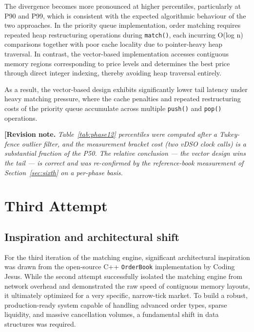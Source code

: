 \documentclass[11pt,a4paper]{article}
\newenvironment{revision}{\par\medskip\noindent\textbf{[Revision note.} \itshape}{\normalfont\par\rmfamily\medskip}
\begin{document}
The divergence becomes more pronounced at higher percentiles, particularly
at P90 and P99, which is consistent with the expected algorithmic behaviour
of the two approaches. In the priority queue implementation, order matching
requires repeated heap restructuring operations during \texttt{match()},
each incurring O(log n) comparisons together with poor cache locality due to
pointer-heavy heap traversal. In contrast, the vector-based implementation
accesses contiguous memory regions corresponding to price levels and
determines the best price through direct integer indexing, thereby avoiding
heap traversal entirely.

As a result, the vector-based design exhibits significantly lower tail
latency under heavy matching pressure, where the cache penalties and
repeated restructuring costs of the priority queue accumulate across
multiple \texttt{push()} and \texttt{pop()} operations.

\begin{revision}
Table~\ref{tab:phase12} percentiles were computed \emph{after} a
Tukey-fence outlier filter, and the measurement bracket cost
(two vDSO clock calls) is a substantial fraction of the P50. The
\emph{relative} conclusion --- the vector design wins the tail --- is
correct and was re-confirmed by the reference-book measurement of
Section~\ref{sec:sixth} on a per-phase basis.
\end{revision}

\section{Third Attempt}\label{sec:third}

\subsection{Inspiration and architectural shift}

For the third iteration of the matching engine, significant architectural
inspiration was drawn from the open-source C++ \texttt{OrderBook}
implementation by Coding Jesus. While the second attempt successfully
isolated the matching engine from network overhead and demonstrated the raw
speed of contiguous memory layouts, it ultimately optimized for a very
specific, narrow-tick market. To build a robust, production-ready system
capable of handling advanced order types, sparse liquidity, and massive
cancellation volumes, a fundamental shift in data structures was required.
\end{document}
